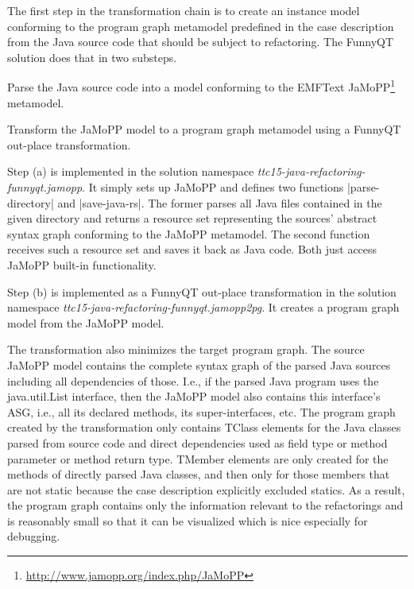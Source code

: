 \documentclass[submission]{eptcs}
\newcommand{\code}{\clojureinline}
\begin{document}
The first step in the transformation chain is to create an instance model
conforming to the program graph metamodel predefined in the case description
from the Java source code that should be subject to refactoring.  The FunnyQT
solution does that in two substeps.

\begin{compactenum}[(a)]
\item Parse the Java source code into a model conforming to the EMFText
  JaMoPP\footnote{\url{http://www.jamopp.org/index.php/JaMoPP}} metamodel.
\item Transform the JaMoPP model to a program graph metamodel using a FunnyQT
  out-place transformation.
\end{compactenum}

Step (a) is implemented in the solution namespace
\emph{ttc15-java-refactoring-funnyqt.jamopp}.  It simply sets up JaMoPP and
defines two functions \code|parse-directory| and \code|save-java-rs|.  The
former parses all Java files contained in the given directory and returns a
resource set representing the sources' abstract syntax graph conforming to the
JaMoPP metamodel.  The second function receives such a resource set and saves
it back as Java code.  Both just access JaMoPP built-in functionality.

Step (b) is implemented as a FunnyQT out-place transformation in the solution
namespace \emph{ttc15-java-refactoring-funnyqt.jamopp2pg}.  It creates a
program graph model from the JaMoPP model.

The transformation also minimizes the target program graph.  The source JaMoPP
model contains the complete syntax graph of the parsed Java sources including
all dependencies of those.  I.e., if the parsed Java program uses the
\textsf{java.util.List} interface, then the JaMoPP model also contains this
interface's ASG, i.e., all its declared methods, its super-interfaces, etc.
The program graph created by the transformation only contains \textsf{TClass}
elements for the Java classes parsed from source code and direct dependencies
used as field type or method parameter or method return type.  \textsf{TMember}
elements are only created for the methods of directly parsed Java classes, and
then only for those members that are not static because the case description
explicitly excluded statics.  As a result, the program graph contains only the
information relevant to the refactorings and is reasonably small so that it can
be visualized which is nice especially for debugging.
\end{document}
